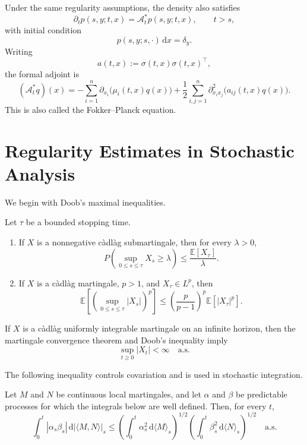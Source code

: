 \begin{thm}
Under the same regularity assumptions, the density also satisfies
\[
\partial_t p(s,y;t,x)
=\mathcal A_t^*p(s,y;t,x),
\qquad t>s,
\]
with initial condition
\[
p(s,y;s,\cdot)\,\mathrm dx=\delta_y.
\]
Writing
\[
a(t,x):=\sigma(t,x)\sigma(t,x)^\top,
\]
the formal adjoint is
\[
(\mathcal A_t^*q)(x)
=-\sum_{i=1}^n\partial_{x_i}\bigl(\mu_i(t,x)q(x)\bigr)
+\frac12\sum_{i,j=1}^n
\partial_{x_ix_j}^2\bigl(a_{ij}(t,x)q(x)\bigr).
\]
This is also called the Fokker--Planck equation.
\end{thm}

\section{Regularity Estimates in Stochastic Analysis}

We begin with Doob's maximal inequalities.

\begin{thm}
Let \(\tau\) be a bounded stopping time.
\begin{enumerate}[label=\textup{(\roman*)}]
\item If \(X\) is a nonnegative c\`adl\`ag submartingale, then for every \(\lambda>0\),
\[
P\!\left(\sup_{0\le s\le\tau}X_s\ge\lambda\right)
\le\frac{\mathbb E[X_\tau]}{\lambda}.
\]

\item If \(X\) is a c\`adl\`ag martingale, \(p>1\), and \(X_\tau\in L^p\), then
\[
\mathbb E\!\left[
\left(\sup_{0\le s\le\tau}|X_s|\right)^p
\right]
\le
\left(\frac{p}{p-1}\right)^p
\mathbb E[|X_\tau|^p].
\]
\end{enumerate}
\end{thm}

\begin{remark}
If \(X\) is a c\`adl\`ag uniformly integrable martingale on an infinite horizon, then the martingale convergence theorem and Doob's inequality imply
\[
\sup_{t\ge0}|X_t|<\infty
\quad\text{a.s.}
\]
\end{remark}

The following inequality controls covariation and is used in stochastic integration.

\begin{prop}
Let \(M\) and \(N\) be continuous local martingales, and let \(\alpha\) and \(\beta\) be predictable processes for which the integrals below are well defined. Then, for every \(t\),
\[
\int_0^t|\alpha_s\beta_s|\,
\mathrm d|\langle M,N\rangle|_s
\le
\left(\int_0^t\alpha_s^2\,\mathrm d\langle M\rangle_s\right)^{1/2}
\left(\int_0^t\beta_s^2\,\mathrm d\langle N\rangle_s\right)^{1/2}
\quad\text{a.s.}
\]
\end{prop}

